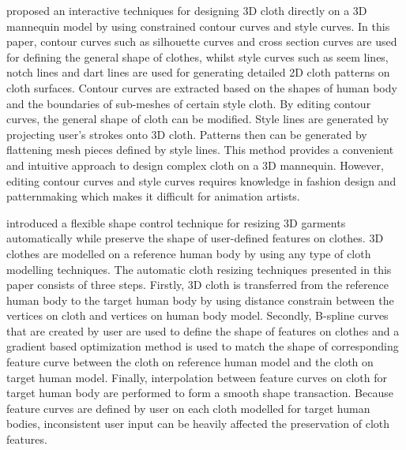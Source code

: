  proposed an interactive techniques for designing 3D cloth directly on a 3D mannequin model by using constrained contour curves and style curves. In this paper, contour curves such as silhouette curves and cross section curves are used for defining the general shape of clothes, whilst style curves such as seem lines, notch lines and dart lines are used for generating detailed 2D cloth patterns on cloth surfaces. Contour curves are extracted based on the shapes of human body and the boundaries of sub-meshes of certain style cloth. By editing contour curves, the general shape of cloth can be modified. Style lines are generated by projecting user's strokes onto 3D cloth. Patterns then can be generated by flattening mesh pieces defined by style lines. This method provides a convenient and intuitive approach to design complex cloth on a 3D mannequin. However, editing contour curves and style curves requires knowledge in fashion design and patternmaking which makes it difficult for animation artists.

 introduced a flexible shape control technique for resizing 3D garments automatically while preserve the shape of user-defined features on clothes. 3D clothes are modelled on a reference human body by using any type of cloth modelling techniques. The automatic cloth resizing techniques presented in this paper consists of three steps. Firstly, 3D cloth is transferred from the reference human body to the target human body by using distance constrain between the vertices on cloth and vertices on human body model. Secondly, B-spline curves that are created by user are used to define the shape of features on clothes and a gradient based optimization method is used to match the shape of corresponding feature curve between the cloth on reference human model and the cloth on target human model. Finally, interpolation between feature curves on cloth for target human body are performed to form a smooth shape transaction. Because feature curves are defined by user on each cloth modelled for target human bodies, inconsistent user input can be heavily affected the preservation of cloth features.

